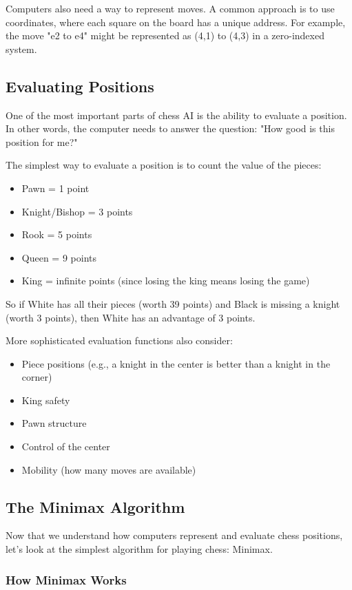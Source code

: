 \documentclass[11pt]{article}
\begin{document}
Computers also need a way to represent moves. A common approach is to use coordinates, where each square on the board has a unique address. For example, the move "e2 to e4" might be represented as (4,1) to (4,3) in a zero-indexed system.

\subsection{Evaluating Positions}

One of the most important parts of chess AI is the ability to evaluate a position. In other words, the computer needs to answer the question: "How good is this position for me?"

The simplest way to evaluate a position is to count the value of the pieces:
\begin{itemize}
    \item Pawn = 1 point
    \item Knight/Bishop = 3 points
    \item Rook = 5 points
    \item Queen = 9 points
    \item King = infinite points (since losing the king means losing the game)
\end{itemize}

So if White has all their pieces (worth 39 points) and Black is missing a knight (worth 3 points), then White has an advantage of 3 points.

More sophisticated evaluation functions also consider:
\begin{itemize}
    \item Piece positions (e.g., a knight in the center is better than a knight in the corner)
    \item King safety
    \item Pawn structure
    \item Control of the center
    \item Mobility (how many moves are available)
\end{itemize}

\subsection{The Minimax Algorithm}

Now that we understand how computers represent and evaluate chess positions, let's look at the simplest algorithm for playing chess: Minimax.

\subsubsection{How Minimax Works}
\end{document}

